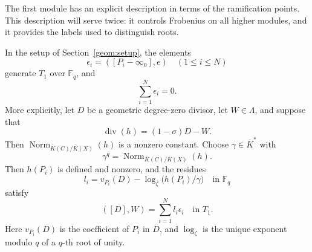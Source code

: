 The first module has an explicit description in terms of the ramification
points.  This description will serve twice: it controls Frobenius on all
higher modules, and it provides the labels used to distinguish roots.

\begin{lemma}
\label{geom:ramification}
In the setup of Section~\ref{geom:setup}, the elements
\[
                   \epsilon_i=([P_i-\infty_0],e)
                   \quad(1\le i\le N)
\]
generate $T_1$ over $\mathbb F_q$, and
\begin{equation}
                         \sum_{i=1}^N\epsilon_i=0.
\label{geom:sum-epsilon}
\end{equation}
More explicitly, let $D$ be a geometric degree-zero divisor, let
$W\in\Lambda$, and suppose that
\[
                  \operatorname{div}(h)=(1-\sigma)D-W.
\]
Then $\operatorname{Norm}_{\overline K(C)/\overline K(X)}(h)$ is a
nonzero constant.  Choose $\gamma\in\overline K^*$ with
\[
 \gamma^q=\operatorname{Norm}_{\overline K(C)/\overline K(X)}(h).
\]
Then $h(P_i)$ is defined and nonzero, and the residues
\begin{equation}
 l_i=v_{P_i}(D)-\log_\zeta\bigl(h(P_i)/\gamma\bigr)
                   \quad\text{in }\mathbb F_q
\label{geom:labels}
\end{equation}
satisfy
\begin{equation}
                         ([D],W)=\sum_{i=1}^N l_i\epsilon_i
                         \quad\text{in }T_1.
\label{geom:label-expansion}
\end{equation}
Here $v_{P_i}(D)$ is the coefficient of $P_i$ in $D$, and
$\log_\zeta$ is the unique exponent modulo $q$ of a $q$-th root of unity.
\end{lemma}

